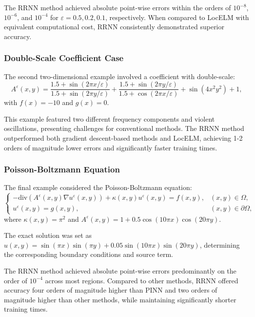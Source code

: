 \documentclass[11pt]{article}
\begin{document}
The RRNN method achieved absolute point-wise errors within the orders of $10^{-8}$, $10^{-6}$, and $10^{-4}$ for $\varepsilon = 0.5, 0.2, 0.1$, respectively. When compared to LocELM with equivalent computational cost, RRNN consistently demonstrated superior accuracy.

\subsubsection{Double-Scale Coefficient Case}

The second two-dimensional example involved a coefficient with double-scale:
\begin{equation}
A^{\varepsilon}(x, y) = \frac{1.5 + \sin(2\pi x/\varepsilon)}{1.5 + \sin(2\pi y/\varepsilon)} + \frac{1.5 + \sin(2\pi y/\varepsilon)}{1.5 + \cos(2\pi x/\varepsilon)} + \sin(4x^2 y^2) + 1,
\end{equation}
with $f(x) = -10$ and $g(x) = 0$.

This example featured two different frequency components and violent oscillations, presenting challenges for conventional methods. The RRNN method outperformed both gradient descent-based methods and LocELM, achieving 1-2 orders of magnitude lower errors and significantly faster training times.

\subsubsection{Poisson-Boltzmann Equation}

The final example considered the Poisson-Boltzmann equation:
\begin{equation}
\begin{cases}
-\text{div}(A^{\varepsilon}(x, y) \nabla u^{\varepsilon}(x, y)) + \kappa(x, y) u^{\varepsilon}(x, y) = f(x, y), & (x, y) \in \Omega, \\
u^{\varepsilon}(x, y) = g(x, y), & (x, y) \in \partial\Omega,
\end{cases}
\end{equation}
where $\kappa(x, y) = \pi^2$ and $A^{\varepsilon}(x, y) = 1 + 0.5 \cos(10\pi x) \cos(20\pi y)$.

The exact solution was set as $u(x, y) = \sin(\pi x) \sin(\pi y) + 0.05 \sin(10\pi x) \sin(20\pi y)$, determining the corresponding boundary conditions and source term.

The RRNN method achieved absolute point-wise errors predominantly on the order of $10^{-4}$ across most regions. Compared to other methods, RRNN offered accuracy four orders of magnitude higher than PINN and two orders of magnitude higher than other methods, while maintaining significantly shorter training times.
\end{document}
